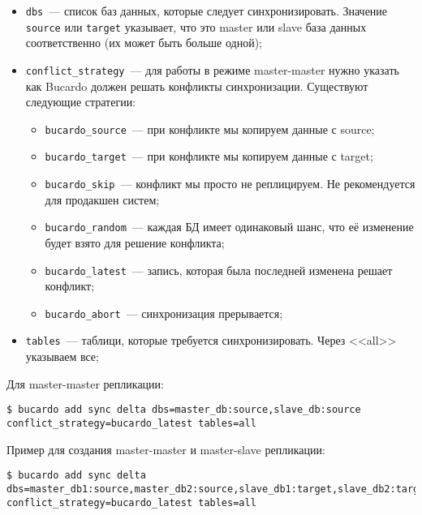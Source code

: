 \begin{itemize}
  \item \lstinline!dbs!~--- список баз данных, которые следует синхронизировать. Значение \lstinline!source! или \lstinline!target! указывает, что это master или slave база данных соответственно (их может быть больше одной);

  \item \lstinline!conflict_strategy!~--- для работы в режиме master-master нужно указать как Bucardo должен решать конфликты синхронизации. Существуют следующие стратегии:

  \begin{itemize}
    \item \lstinline!bucardo_source!~--- при конфликте мы копируем данные с source;
    \item \lstinline!bucardo_target!~--- при конфликте мы копируем данные с target;
    \item \lstinline!bucardo_skip!~--- конфликт мы просто не реплицируем. Не рекомендуется для продакшен систем;
    \item \lstinline!bucardo_random!~--- каждая БД имеет одинаковый шанс, что её изменение будет взято для решение конфликта;
    \item \lstinline!bucardo_latest!~--- запись, которая была последней изменена решает конфликт;
    \item \lstinline!bucardo_abort!~--- синхронизация прерывается;
  \end{itemize}

  \item \lstinline!tables!~--- таблици, которые требуется синхронизировать. Через <<all>> указываем все;
\end{itemize}

Для master-master репликации:

\begin{lstlisting}[label=lst:bucardo10,caption=Настройка репликации]
$ bucardo add sync delta dbs=master_db:source,slave_db:source conflict_strategy=bucardo_latest tables=all
\end{lstlisting}

Пример для создания master-master и master-slave репликации:

\begin{lstlisting}[label=lst:bucardo-master-slave1,caption=Настройка репликации]
$ bucardo add sync delta dbs=master_db1:source,master_db2:source,slave_db1:target,slave_db2:target conflict_strategy=bucardo_latest tables=all
\end{lstlisting}

